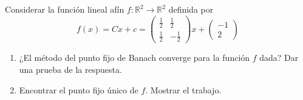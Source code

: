 \documentclass[12pt]{book}
\newcommand{\R}{\mathbb{R}}
\begin{document}
\eje Considerar la función lineal afín $f:\R^2\rightarrow\R^2$ definida por
\[ f(x)=Cx+c=\begin{pmatrix}
\frac{1}{2} & \frac{1}{2}\\
\frac{1}{2} & -\frac{1}{2}
\end{pmatrix} x + \begin{pmatrix}
-1\\
2
\end{pmatrix}\]
\renewcommand{\labelenumi}{(\alph{enumi})}
\begin{enumerate}
    \item ¿El método del punto fijo de Banach converge para la función $f$ dada? Dar una prueba de la respuesta.
    \item Encontrar el punto fijo único de $f$. Mostrar el trabajo.
\end{enumerate}
\end{document}
